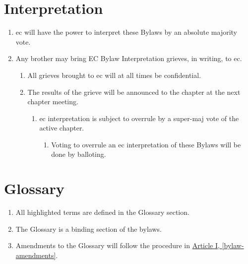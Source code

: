 \section{Interpretation}
	\label{interpretation}
	\begin{enumerate}
		\item \Gls{ec} will have the power to interpret these Bylaws by an absolute majority vote.

		\item Any brother may bring EC Bylaw Interpretation \glspl{grieve}, in writing, to \gls{ec}.

		\begin{enumerate}
			\item All \glspl{grieve} brought to \gls{ec} will at all times be confidential.

			\item The results of the \gls{grieve} will be announced to the chapter at the next chapter meeting.

			\begin{enumerate}
				\item \gls{ec} interpretation is subject to overrule by a \gls{super-maj} vote of the active chapter.

				\begin{enumerate}
					\item Voting to overrule an \gls{ec} interpretation of these Bylaws will be done by \gls{balloting}.
				\end{enumerate}
			\end{enumerate}
		\end{enumerate}
	\end{enumerate}

\section{Glossary}
	\begin{enumerate}
		\item All highlighted terms are defined in the Glossary section. 
		\item The Glossary is a binding section of the bylaws. 
		\item Amendments to the Glossary will follow the procedure in \hyperref[bylaw-amendments]{Article I, \autoref*{bylaw-amendments}}.
	\end{enumerate}
	
